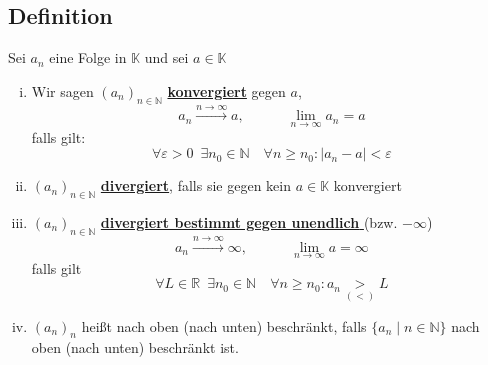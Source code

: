 \subsection{Definition} %
\label{sub:definition}
Sei $a_n$ eine Folge in $\mathds{K}$ und sei $a \in \mathds{K}$
\begin{enumerate}[(i)]
	\item Wir sagen $(a_n)_{n \in \mathds{N}}$ \underline{\textbf{konvergiert}} gegen $a$, 
	\[
		a_n \xrightarrow {n \to \infty} a , \quad \quad \quad \lim\limits_{n \to \infty} {a_n} = a
	\]
	falls gilt:
	\[
		\forall \varepsilon > 0 \enspace \exists n_0 \in \mathds{N} 
		\quad \forall n \geq n_0 : |a_n -a| < \varepsilon
	\]
	\item $(a_n)_{n \in \mathds{N}}$ \underline{\textbf{divergiert}}, 
	falls sie gegen kein $a \in \mathds{K}$ konvergiert
	\item $(a_n)_{n \in \mathds{N}}$ \underline{\textbf{divergiert bestimmt gegen unendlich} }
	{\small (bzw. $- \infty$)}
	\[
		a_n \xrightarrow{n\to \infty} \infty , \quad \quad \quad \lim\limits_{n\to \infty} a = \infty
	\]
	falls gilt
	\[
		\forall L \in \mathds{R} \enspace \exists n_0 \in \mathds{N} \quad \forall n \geq n_0 : a_n \underset{(<)}{>} L 
	\]
	\item $(a_n)_n$ heißt nach oben (nach unten) beschränkt, falls $\{a_n \mid n \in \mathds{N} \}$ nach oben (nach unten) beschränkt ist.
\end{enumerate}

